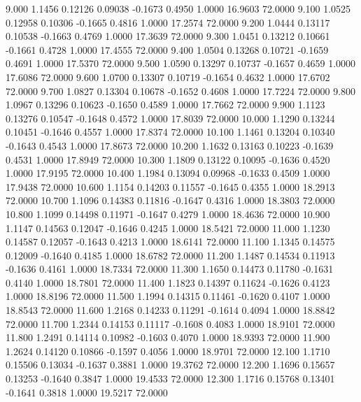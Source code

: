    9.000   1.1456   0.12126   0.09038  -0.1673   0.4950   1.0000  16.9603  72.0000
   9.100   1.0525   0.12958   0.10306  -0.1665   0.4816   1.0000  17.2574  72.0000
   9.200   1.0444   0.13117   0.10538  -0.1663   0.4769   1.0000  17.3639  72.0000
   9.300   1.0451   0.13212   0.10661  -0.1661   0.4728   1.0000  17.4555  72.0000
   9.400   1.0504   0.13268   0.10721  -0.1659   0.4691   1.0000  17.5370  72.0000
   9.500   1.0590   0.13297   0.10737  -0.1657   0.4659   1.0000  17.6086  72.0000
   9.600   1.0700   0.13307   0.10719  -0.1654   0.4632   1.0000  17.6702  72.0000
   9.700   1.0827   0.13304   0.10678  -0.1652   0.4608   1.0000  17.7224  72.0000
   9.800   1.0967   0.13296   0.10623  -0.1650   0.4589   1.0000  17.7662  72.0000
   9.900   1.1123   0.13276   0.10547  -0.1648   0.4572   1.0000  17.8039  72.0000
  10.000   1.1290   0.13244   0.10451  -0.1646   0.4557   1.0000  17.8374  72.0000
  10.100   1.1461   0.13204   0.10340  -0.1643   0.4543   1.0000  17.8673  72.0000
  10.200   1.1632   0.13163   0.10223  -0.1639   0.4531   1.0000  17.8949  72.0000
  10.300   1.1809   0.13122   0.10095  -0.1636   0.4520   1.0000  17.9195  72.0000
  10.400   1.1984   0.13094   0.09968  -0.1633   0.4509   1.0000  17.9438  72.0000
  10.600   1.1154   0.14203   0.11557  -0.1645   0.4355   1.0000  18.2913  72.0000
  10.700   1.1096   0.14383   0.11816  -0.1647   0.4316   1.0000  18.3803  72.0000
  10.800   1.1099   0.14498   0.11971  -0.1647   0.4279   1.0000  18.4636  72.0000
  10.900   1.1147   0.14563   0.12047  -0.1646   0.4245   1.0000  18.5421  72.0000
  11.000   1.1230   0.14587   0.12057  -0.1643   0.4213   1.0000  18.6141  72.0000
  11.100   1.1345   0.14575   0.12009  -0.1640   0.4185   1.0000  18.6782  72.0000
  11.200   1.1487   0.14534   0.11913  -0.1636   0.4161   1.0000  18.7334  72.0000
  11.300   1.1650   0.14473   0.11780  -0.1631   0.4140   1.0000  18.7801  72.0000
  11.400   1.1823   0.14397   0.11624  -0.1626   0.4123   1.0000  18.8196  72.0000
  11.500   1.1994   0.14315   0.11461  -0.1620   0.4107   1.0000  18.8543  72.0000
  11.600   1.2168   0.14233   0.11291  -0.1614   0.4094   1.0000  18.8842  72.0000
  11.700   1.2344   0.14153   0.11117  -0.1608   0.4083   1.0000  18.9101  72.0000
  11.800   1.2491   0.14114   0.10982  -0.1603   0.4070   1.0000  18.9393  72.0000
  11.900   1.2624   0.14120   0.10866  -0.1597   0.4056   1.0000  18.9701  72.0000
  12.100   1.1710   0.15506   0.13034  -0.1637   0.3881   1.0000  19.3762  72.0000
  12.200   1.1696   0.15657   0.13253  -0.1640   0.3847   1.0000  19.4533  72.0000
  12.300   1.1716   0.15768   0.13401  -0.1641   0.3818   1.0000  19.5217  72.0000
